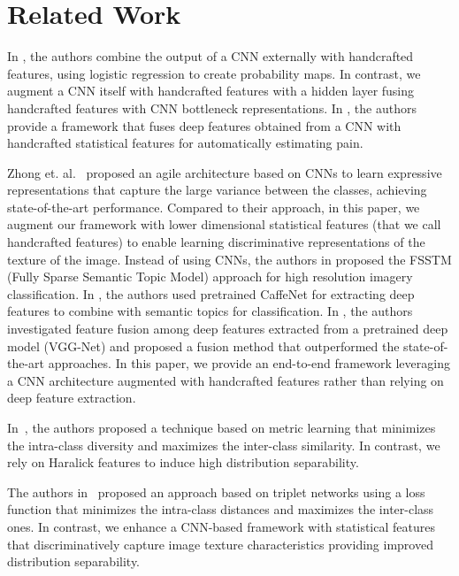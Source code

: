 \documentclass[]{interact}
\theoremstyle{plain}\newtheorem{theorem}{Theorem}[section]
\theoremstyle{definition}
\theoremstyle{remark}
\begin{document}
\section{Related Work}



In \citep{effectivesemantic2015}, the authors combine the output of a CNN externally  with handcrafted features, using logistic regression to create probability maps. In contrast, we augment a CNN itself with handcrafted features with a  hidden layer fusing handcrafted features with CNN bottleneck representations.  In \citep{egede2017fusing}, the authors provide a framework that fuses deep features obtained from a CNN with handcrafted statistical features for automatically estimating pain. 

Zhong et. al.~\citep{zhong2017satcnn} proposed an agile architecture based on CNNs  to learn expressive representations that capture  the large variance between the classes, achieving   state-of-the-art performance. 
Compared to their approach, in this paper, we augment our framework with  lower dimensional statistical features (that we call handcrafted features)   to enable learning discriminative representations of  the texture of the image.
Instead of using CNNs, the authors in \citep{zhu2017scene} proposed the FSSTM (Fully Sparse Semantic Topic Model) approach for high  resolution imagery classification. 
In \citep{zhu2018adaptive},  the authors used pretrained CaffeNet for extracting deep features to combine with semantic topics for classification. In \citep{chaib2017deep}, the authors investigated feature fusion among deep features extracted from a pretrained deep model (VGG-Net) and proposed a fusion method that
outperformed the state-of-the-art approaches. In this paper, we provide an end-to-end   framework  leveraging a CNN architecture augmented with handcrafted features rather than relying on  deep feature extraction.

In~\citep{cheng2018deep},  the authors proposed  a  technique based on metric learning  that minimizes  the intra-class diversity and  maximizes the inter-class similarity. In contrast, we rely on Haralick features to induce high distribution separability. 

The  authors in~\citep{liu2018scene} proposed an approach based on triplet networks using a loss function that  minimizes the intra-class  distances and maximizes the inter-class ones.  In contrast, we enhance a CNN-based framework with statistical features that discriminatively capture image texture characteristics providing improved distribution separability. 
\end{document}

